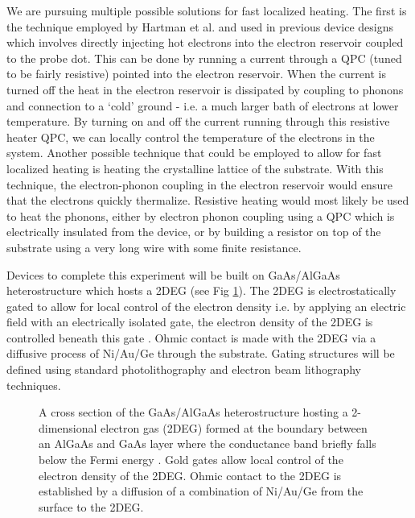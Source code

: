 We are pursuing multiple possible solutions for fast localized heating. The first is the technique employed by Hartman et al. and used in previous device designs which involves directly injecting hot electrons into the electron reservoir coupled to the probe dot. This can be done by running a current through a QPC (tuned to be fairly resistive) pointed into the electron reservoir. When the current is turned off the heat in the electron reservoir is dissipated by coupling to phonons and connection to a `cold' ground - i.e. a much larger bath of electrons at lower temperature. By turning on and off the current running through this resistive heater QPC, we can locally control the temperature of the electrons in the system. Another possible technique that could be employed to allow for fast localized heating is heating the crystalline lattice of the substrate. With this technique, the electron-phonon coupling in the electron reservoir would ensure that the electrons quickly thermalize. Resistive heating would most likely be used to heat the phonons, either by electron phonon coupling using a QPC which is electrically insulated from the device, or by building a resistor on top of the substrate using a very long wire with some finite resistance.

Devices to complete this experiment will be built on GaAs/AlGaAs heterostructure which hosts a 2DEG (see Fig \ref{fig:algaas}). The 2DEG is electrostatically gated to allow for local control of the electron density i.e. by applying an electric field with an electrically isolated gate, the electron density of the 2DEG is controlled beneath this gate \cite{Kouwenhoven1997}. Ohmic contact is made with the 2DEG via a diffusive process of Ni/Au/Ge through the substrate. Gating structures will be defined using standard photolithography and electron beam lithography techniques.  

\begin{figure}[h]
\centering
{}
\caption{ A cross section of the GaAs/AlGaAs heterostructure hosting a 2-dimensional electron gas (2DEG) formed at the boundary between an AlGaAs and GaAs layer where the conductance band briefly falls below the Fermi energy \cite{Baer}. Gold gates allow local control of the electron density of the 2DEG. Ohmic contact to the 2DEG is established by a diffusion of a combination of Ni/Au/Ge from the surface to the 2DEG.}

\label{fig:algaas}       %
\end{figure}

\endinput

Any text after an \endinput is ignored.
You could put scraps here or things in progress.
